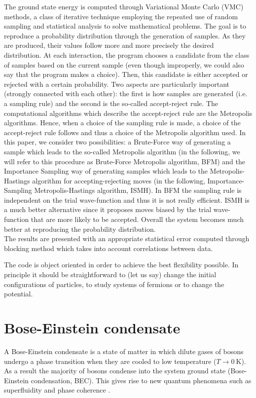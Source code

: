 The ground state energy is computed through Variational Monte Carlo (VMC) methods, a class of iterative technique employing the repeated use of random sampling and statistical analysis to solve mathematical problems. The goal is to reproduce a probability distribution through the generation of samples. As they are produced, their values follow more and more precisely the desired distribution. At each interaction, the program chooses a candidate from the class of samples based on the current sample (even though improperly, we could also say that the program makes a choice). Then, this candidate is either accepted or rejected with a certain probability. Two aspects are particularly important (strongly connected with each other): the first is how samples are generated (i.e. a sampling rule) and the second is the so-called accept-reject rule. The computational algorithms which describe the accept-reject rule are the Metropolis algorithms. Hence, when a choice of the sampling rule is made, a choice of the accept-reject rule follows and thus a choice of the Metropolis algorithm used. In this paper, we consider two possibilities: a Brute-Force way of generating a sample which leads to the so-called Metropolis algorithm (in the following, we will refer to this procedure as Brute-Force Metropolis algorithm, BFM) and the Importance Sampling way of generating samples which leads to the Metropolis-Hastings algorithm for accepting-rejecting moves (in the following, Importance-Sampling Metropolis-Hastings algorithm, ISMH). In BFM the sampling rule is independent on the trial wave-function and thus it is not really efficient. ISMH is a much better alternative since it proposes moves biased by the trial wave-function that are more likely to be accepted.  Overall the system becomes much better at reproducing the probability distribution.\\

The results are presented with an appropriate statistical error computed through blocking method which takes into account correlations between data.

The code is object oriented in order to achieve the best flexibility possible. In principle it should be straightforward to (let us say) change the initial configurations of particles, to study systems of fermions or to change the potential.

\section{Bose-Einstein condensate}
A Bose-Einstein condensate is a state of matter in which dilute gases of bosons undergo a phase transition when they are cooled to low temperature ($T\rightarrow 0\ \si{\kelvin}$). As a result the majority of bosons condense into the system ground state (Bose-Einstein condensation, BEC). This gives rise to new quantum phenomena such as superfluidity and phase coherence \cite{Stringari}. 

